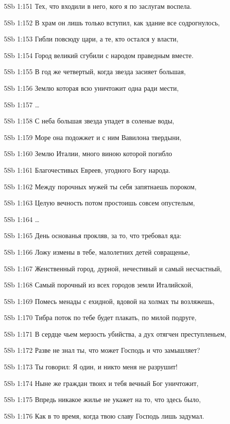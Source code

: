 \vs 5Sb 1:151 Тех, что входили в него, кого я по заслугам воспела.

\vs 5Sb 1:152 В храм он лишь только вступил, как здание все содрогнулось,

\vs 5Sb 1:153 Гибли повсюду цари, а те, кто остался у власти,

\vs 5Sb 1:154 Город великий сгубили с народом праведным вместе.

\vs 5Sb 1:155 В год же четвертый, когда звезда засияет большая, 

\vs 5Sb 1:156 Землю которая всю уничтожит одна ради мести,

\vs 5Sb 1:157 \ldots

\vs 5Sb 1:158 С неба большая звезда упадет в соленые воды, 

\vs 5Sb 1:159 Море она подожжет и с ним Вавилона твердыни, 

\vs 5Sb 1:160 Землю Италии, много виною которой погибло 

\vs 5Sb 1:161 Благочестивых Евреев, угодного Богу народа.

\vs 5Sb 1:162 Между порочных мужей ты себя запятнаешь пороком, 

\vs 5Sb 1:163 Целую вечность потом простоишь совсем опустелым,

\vs 5Sb 1:164 \ldots

\vs 5Sb 1:165 День основанья прокляв, за то, что требовал яда: 

\vs 5Sb 1:166 Ложу измены в тебе, малолетних детей совращенье, 

\vs 5Sb 1:167 Женственный город, дурной, нечестивый и самый несчастный,

\vs 5Sb 1:168 Самый порочный из всех городов земли Италийской, 

\vs 5Sb 1:169 Помесь менады с ехидной, вдовой на холмах ты возляжешь,

\vs 5Sb 1:170 Тибра поток по тебе будет плакать, по милой подруге, 

\vs 5Sb 1:171 В сердце чьем мерзость убийства, а дух отягчен преступленьем,

\vs 5Sb 1:172 Разве не знал ты, что может Господь и что замышляет? 

\vs 5Sb 1:173 Ты говорил: Я один, и никто меня не разрушит!

\vs 5Sb 1:174 Ныне же граждан твоих и тебя вечный Бог уничтожит, 

\vs 5Sb 1:175 Впредь никакое жилье не укажет на то, что здесь было, 

\vs 5Sb 1:176 Как в то время, когда твою славу Господь лишь задумал. 

